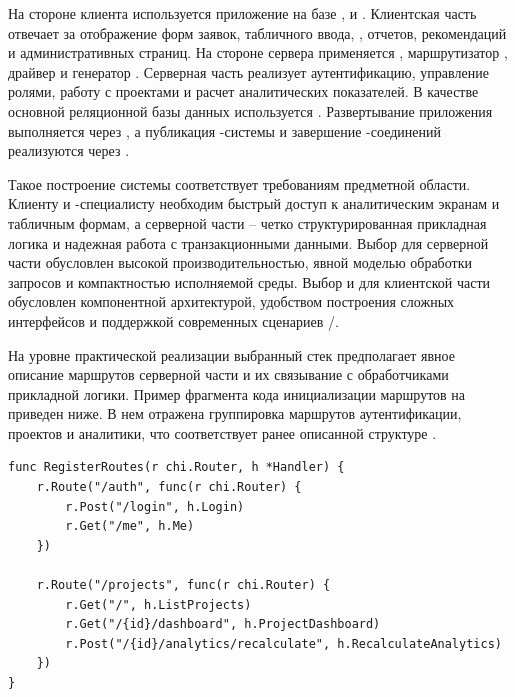 На стороне клиента используется приложение на базе ,  и . Клиентская часть отвечает за отображение форм заявок, табличного ввода, , отчетов, рекомендаций и административных страниц. На стороне сервера применяется , маршрутизатор , драйвер  и генератор . Серверная часть реализует аутентификацию, управление ролями, работу с проектами и расчет аналитических показателей. В качестве основной реляционной базы данных используется . Развертывание приложения выполняется через , а публикация -системы и завершение -соединений реализуются через .

Такое построение системы соответствует требованиям предметной области. Клиенту и -специалисту необходим быстрый доступ к аналитическим экранам и табличным формам, а серверной части -- четко структурированная прикладная логика и надежная работа с транзакционными данными. Выбор  для серверной части обусловлен высокой производительностью, явной моделью обработки запросов и компактностью исполняемой среды. Выбор  и  для клиентской части обусловлен компонентной архитектурой, удобством построения сложных интерфейсов и поддержкой современных сценариев /.

На уровне практической реализации выбранный стек предполагает явное описание маршрутов серверной части и их связывание с обработчиками прикладной логики. Пример фрагмента кода инициализации маршрутов на  приведен ниже. В нем отражена группировка маршрутов аутентификации, проектов и аналитики, что соответствует ранее описанной структуре .

\begin{center}
\begin{minipage}{0.92\textwidth}
\captionsetup{type=figure}
\label{fig:go-router-code}
\begin{Verbatim}[frame=single,fontsize=\fontsize{10pt}{12pt}\selectfont]
func RegisterRoutes(r chi.Router, h *Handler) {
    r.Route("/auth", func(r chi.Router) {
        r.Post("/login", h.Login)
        r.Get("/me", h.Me)
    })

    r.Route("/projects", func(r chi.Router) {
        r.Get("/", h.ListProjects)
        r.Get("/{id}/dashboard", h.ProjectDashboard)
        r.Post("/{id}/analytics/recalculate", h.RecalculateAnalytics)
    })
}
\end{Verbatim}
\end{minipage}
\end{center}

